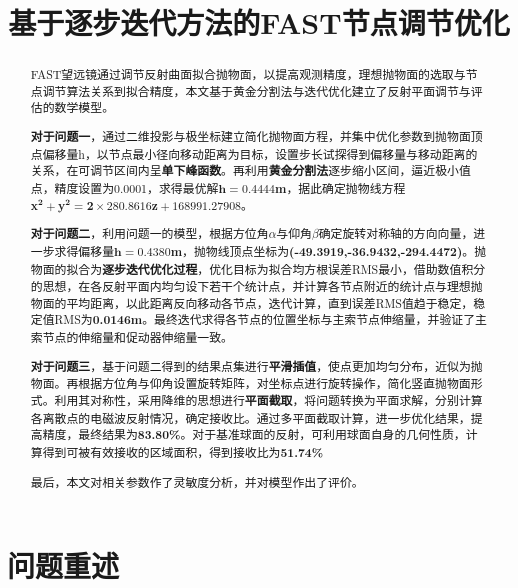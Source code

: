 \documentclass[withoutpreface,bwprint]{cumcmthesis} %
\title{基于逐步迭代方法的FAST节点调节优化}
\begin{document}
	\graphicspath{{figures/}}
	\maketitle
	\begin{abstract}
	FAST望远镜通过调节反射曲面拟合抛物面，以提高观测精度，理想抛物面的选取与节点调节算法关系到拟合精度，本文基于黄金分割法与迭代优化建立了反射平面调节与评估的数学模型。
	
	\textbf{对于问题一}，通过二维投影与极坐标建立简化抛物面方程，并集中优化参数到抛物面顶点偏移量h，以节点最小径向移动距离为目标，设置步长试探得到偏移量与移动距离的关系，在可调节区间内呈\textbf{单下峰函数}。再利用\textbf{黄金分割法}逐步缩小区间，逼近极小值点，精度设置为0.0001，求得最优解$\bm{h=0.4444m}$，据此确定抛物线方程$\bm{x^{2} + y^{2} =2\times280.8616z+168991.27908}$。
	
	\textbf{对于问题二}，利用问题一的模型，根据方位角$\alpha$与仰角$\beta$确定旋转对称轴的方向向量，进一步求得偏移量$\bm{h=0.4380m}$，抛物线顶点坐标为\textbf{(-49.3919,-36.9432,-294.4472)}。抛物面的拟合为\textbf{逐步迭代优化过程}，优化目标为拟合均方根误差RMS最小，借助数值积分的思想，在各反射平面内均匀设下若干个统计点，并计算各节点附近的统计点与理想抛物面的平均距离，以此距离反向移动各节点，迭代计算，直到误差RMS值趋于稳定，稳定值RMS为\textbf{0.0146m}。最终迭代求得各节点的位置坐标与主索节点伸缩量，并验证了主索节点的伸缩量和促动器伸缩量一致。
	
	\textbf{对于问题三}，基于问题二得到的结果点集进行\textbf{平滑插值}，使点更加均匀分布，近似为抛物面。再根据方位角与仰角设置旋转矩阵，对坐标点进行旋转操作，简化竖直抛物面形式。利用其对称性，采用降维的思想进行\textbf{平面截取}，将问题转换为平面求解，分别计算各离散点的电磁波反射情况，确定接收比。通过多平面截取计算，进一步优化结果，提高精度，最终结果为\textbf{83.80\%}。对于基准球面的反射，可利用球面自身的几何性质，计算得到可被有效接收的区域面积，得到接收比为\textbf{51.74\%}
	
	最后，本文对相关参数作了灵敏度分析，并对模型作出了评价。
	
	
		
	\end{abstract}
	
	
	\section{问题重述}
\end{document}
